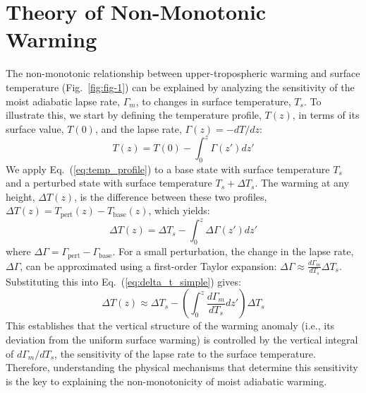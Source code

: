 \documentclass[draft]{ametsocV6.1}
\begin{document}
\section{Theory of Non-Monotonic Warming}
The non-monotonic relationship between upper-tropospheric warming and surface temperature (Fig.~\ref{fig:fig-1}) can be explained by analyzing the sensitivity of the moist adiabatic lapse rate, $\Gamma_m$, to changes in surface temperature, $T_s$. To illustrate this, we start by defining the temperature profile, $T(z)$, in terms of its surface value, $T(0)$, and the lapse rate, $\Gamma(z)=-dT/dz$:
\begin{equation}
T(z)=T(0)-\int_0^z \Gamma(z')dz' \label{eq:temp_profile}
\end{equation}
We apply Eq.~(\ref{eq:temp_profile}) to a base state with surface temperature $T_s$ and a perturbed state with surface temperature $T_s + \Delta T_s$. The warming at any height, $\Delta T(z)$, is the difference between these two profiles, $\Delta T(z) = T_{\text{pert}}(z) - T_{\text{base}}(z)$, which yields:
\begin{equation}
\Delta T(z)=\Delta T_s-\int_0^z\Delta \Gamma(z')dz' \label{eq:delta_t_simple}
\end{equation}
where $\Delta \Gamma = \Gamma_{\text{pert}} - \Gamma_{\text{base}}$. For a small perturbation, the change in the lapse rate, $\Delta\Gamma$, can be approximated using a first-order Taylor expansion: $\Delta\Gamma\approx \frac{d\Gamma_m}{dT_s} \Delta T_s$. Substituting this into Eq.~(\ref{eq:delta_t_simple}) gives:
\begin{equation}
\Delta T(z)\approx\Delta T_s-\left(\int_0^z\frac{d\Gamma_m}{dT_s}dz'\right)\Delta T_s \label{eq:delta_t_taylor}
\end{equation}
This establishes that the vertical structure of the warming anomaly (i.e., its deviation from the uniform surface warming) is controlled by the vertical integral of $d\Gamma_m/dT_s$, the sensitivity of the lapse rate to the surface temperature. Therefore, understanding the physical mechanisms that determine this sensitivity is the key to explaining the non-monotonicity of moist adiabatic warming.
\end{document}
